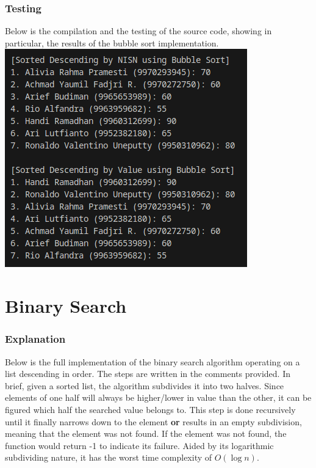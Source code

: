 \documentclass[12pt]{article}
\begin{document}
\subsubsection{Testing}
Below is the compilation and the testing of the source code, showing in particular, the results of the bubble sort implementation.
\newline\includegraphics[width=\textwidth]{01_sort_search_bubble}

\section{Binary Search}

\subsubsection{Explanation}

Below is the full implementation of the binary search algorithm operating on a list descending in order. The steps are written in the comments provided. In brief, given a sorted list, the algorithm subdivides it into two halves. Since elements of one half will always be higher/lower in value than the other, it can be figured which half the searched value belongs to. This step is done recursively until it finally narrows down to the element \textbf{or} results in an empty subdivision, meaning that the element was not found. If the element was not found, the function would return -1 to indicate its failure. Aided by its logarithmic subdividing nature, it has the worst time complexity of $O(\log n)$.
\end{document}
